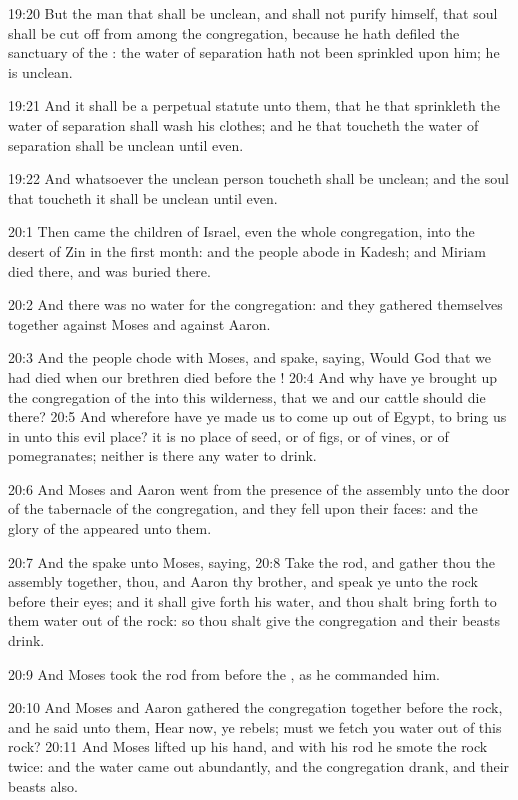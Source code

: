 19:20 But the man that shall be unclean, and shall not purify himself,
that soul shall be cut off from among the congregation, because he
hath defiled the sanctuary of the \LORD: the water of separation hath
not been sprinkled upon him; he is unclean.

19:21 And it shall be a perpetual statute unto them, that he that
sprinkleth the water of separation shall wash his clothes; and he that
toucheth the water of separation shall be unclean until even.

19:22 And whatsoever the unclean person toucheth shall be unclean; and
the soul that toucheth it shall be unclean until even.

20:1 Then came the children of Israel, even the whole congregation,
into the desert of Zin in the first month: and the people abode in
Kadesh; and Miriam died there, and was buried there.

20:2 And there was no water for the congregation: and they gathered
themselves together against Moses and against Aaron.

20:3 And the people chode with Moses, and spake, saying, Would God
that we had died when our brethren died before the \LORD!  20:4 And why
have ye brought up the congregation of the \LORD into this wilderness,
that we and our cattle should die there?  20:5 And wherefore have ye
made us to come up out of Egypt, to bring us in unto this evil place?
it is no place of seed, or of figs, or of vines, or of pomegranates;
neither is there any water to drink.

20:6 And Moses and Aaron went from the presence of the assembly unto
the door of the tabernacle of the congregation, and they fell upon
their faces: and the glory of the \LORD appeared unto them.

20:7 And the \LORD spake unto Moses, saying, 20:8 Take the rod, and
gather thou the assembly together, thou, and Aaron thy brother, and
speak ye unto the rock before their eyes; and it shall give forth his
water, and thou shalt bring forth to them water out of the rock: so
thou shalt give the congregation and their beasts drink.

20:9 And Moses took the rod from before the \LORD, as he commanded him.

20:10 And Moses and Aaron gathered the congregation together before
the rock, and he said unto them, Hear now, ye rebels; must we fetch
you water out of this rock?  20:11 And Moses lifted up his hand, and
with his rod he smote the rock twice: and the water came out
abundantly, and the congregation drank, and their beasts also.

